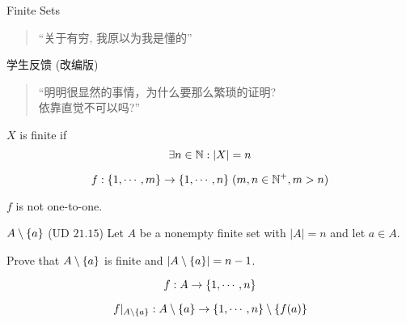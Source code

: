 \begin{frame}{}
  \centerline{\LARGE Finite Sets}

  \vspace{0.50cm}

  \pause
  \begin{quote}
    \begin{center}
      {\large ``关于有穷, 我原以为我是懂的''}
    \end{center}
  \end{quote}
\end{frame}

\begin{frame}{}
  \begin{exampleblock}{学生反馈 (改编版)}
    \begin{quote}
      \begin{center}
	``明明很显然的事情，为什么要那么繁琐的证明?\\[6pt]
	依靠直觉不可以吗?''
      \end{center}
    \end{quote}
  \end{exampleblock}
\end{frame}

\begin{frame}{}
  \begin{definition}[Finite]
    $X$ is finite if
    \[
      \exists n \in \mathbb{N}: |X| = n
    \]
  \end{definition}

  \vspace{0.60cm}
  \begin{theorem}
    \[
      f: \{1, \cdots, m\} \to \{1, \cdots, n\} \; (m,n \in \mathbb{N}^{+}, m > n)
    \]

    $f$ is not one-to-one.
  \end{theorem}
\end{frame}

\begin{frame}{}
  \begin{exampleblock}{$A \setminus \{a\}$ (UD $21.15$)}
    Let $A$ be a nonempty finite set with $|A| = n$ and let $a \in A$.

    Prove that $A \setminus \{a\}$ is finite and $|A \setminus \{a\}| = n - 1$.
  \end{exampleblock}

  \[
    f: A \to \{1, \cdots, n\}
  \]

  \pause
  \[
    f|_{A \setminus \{a\}}: A \setminus \{a\} \to \{1, \cdots, n\} \setminus \{f(a)\}
  \]
\end{frame}

